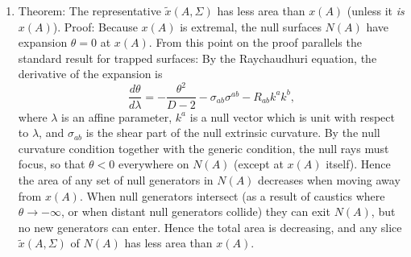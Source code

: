 \documentclass{article}
\begin{document}
\begin{enumerate}
\item \label{trap} Theorem: The representative $\tilde{x}(A,\Sigma)$ has less area than $x(A)$ (unless it \emph{is} $x(A)$).  Proof: Because $x(A)$ is extremal, the null surfaces $N(A)$ have expansion $\theta = 0$ at $x(A)$.  From this point on the proof parallels the standard result \cite{HawkingEllis} for trapped surfaces: By the Raychaudhuri equation, the derivative of the expansion is
\begin{equation}\label{Ray}
\frac{d\theta}{d\lambda} = -\frac{\theta^2}{D-2} - \sigma_{ab}\sigma^{ab} - R_{ab} k^a k^b,
\end{equation}
where $\lambda$ is an affine parameter, $k^a$ is a null vector which is unit with respect to $\lambda$, and $\sigma_{ab}$ is the shear part of the null extrinsic curvature.  By the null curvature condition together with the generic condition, the null rays must focus, so that $\theta < 0$ everywhere on $N(A)$ (except at $x(A)$ itself).  Hence the area of any set of null generators in $N(A)$ decreases when moving away from $x(A)$.  When null generators intersect (as a result of caustics where $\theta \to -\infty$, or when distant null generators collide) they can exit $N(A)$, but no new generators can enter.  Hence the total area is decreasing, and any slice $\tilde{x}(A,\Sigma)$ of $N(A)$ has less area than $x(A)$.


\end{enumerate}
\end{document}
